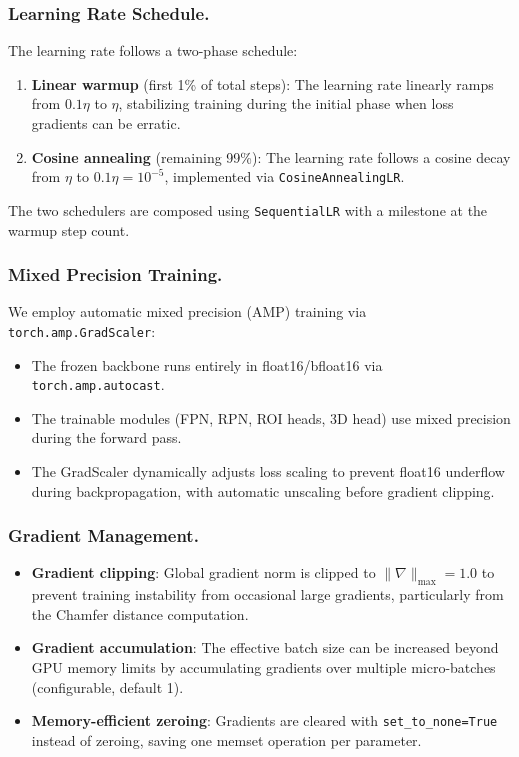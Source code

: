 \documentclass[runningheads]{llncs}
\begin{document}
\subsubsection{Learning Rate Schedule.}
The learning rate follows a two-phase schedule:
\begin{enumerate}
    \item \textbf{Linear warmup} (first 1\% of total steps): The learning rate linearly ramps from $0.1\eta$ to $\eta$, stabilizing training during the initial phase when loss gradients can be erratic.
    \item \textbf{Cosine annealing} (remaining 99\%): The learning rate follows a cosine decay from $\eta$ to $0.1\eta = 10^{-5}$, implemented via \texttt{CosineAnnealingLR}.
\end{enumerate}
The two schedulers are composed using \texttt{SequentialLR} with a milestone at the warmup step count.

\subsubsection{Mixed Precision Training.}
We employ automatic mixed precision (AMP) training via \texttt{torch.amp.GradScaler}:
\begin{itemize}
    \item The frozen backbone runs entirely in float16/bfloat16 via \texttt{torch.amp.autocast}.
    \item The trainable modules (FPN, RPN, ROI heads, 3D head) use mixed precision during the forward pass.
    \item The GradScaler dynamically adjusts loss scaling to prevent float16 underflow during backpropagation, with automatic unscaling before gradient clipping.
\end{itemize}

\subsubsection{Gradient Management.}
\begin{itemize}
    \item \textbf{Gradient clipping}: Global gradient norm is clipped to $\|\nabla\|_{\max} = 1.0$ to prevent training instability from occasional large gradients, particularly from the Chamfer distance computation.
    \item \textbf{Gradient accumulation}: The effective batch size can be increased beyond GPU memory limits by accumulating gradients over multiple micro-batches (configurable, default 1).
    \item \textbf{Memory-efficient zeroing}: Gradients are cleared with \texttt{set\_to\_none=True} instead of zeroing, saving one memset operation per parameter.
\end{itemize}
\end{document}
